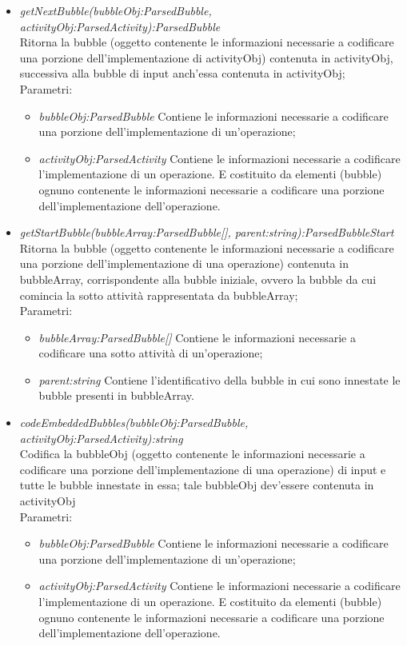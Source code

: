 \documentclass[../DefinizioneDiProdotto.tex]{subfiles}
\begin{document}
\begin{itemize}
\begin{itemize}
					\item \emph{getNextBubble(bubbleObj:ParsedBubble, activityObj:ParsedActivity):ParsedBubble} \\ 
					Ritorna la bubble (oggetto contenente le informazioni necessarie a codificare una porzione dell'implementazione di activityObj) contenuta in activityObj, successiva alla bubble di input anch'essa contenuta in activityObj; \\
					Parametri:
					\begin{itemize}
						\item \emph{bubbleObj:ParsedBubble} Contiene le informazioni necessarie a codificare una porzione dell'implementazione di un'operazione;
						\item \emph{activityObj:ParsedActivity} Contiene le informazioni necessarie a codificare l'implementazione di un operazione. E costituito da elementi (bubble) ognuno contenente le informazioni necessarie a codificare una porzione dell'implementazione dell'operazione.
					\end{itemize}	
					
					\item \emph{getStartBubble(bubbleArray:ParsedBubble[], parent:string):ParsedBubbleStart} \\ 
					Ritorna la bubble (oggetto contenente le informazioni necessarie a codificare una porzione dell'implementazione di una operazione) contenuta in bubbleArray, corrispondente alla bubble iniziale, ovvero la bubble da cui comincia la sotto attività rappresentata da bubbleArray; \\
					Parametri:
					\begin{itemize}
						\item \emph{bubbleArray:ParsedBubble[]} Contiene le informazioni necessarie a codificare una sotto attività di un'operazione;
						\item \emph{parent:string} Contiene l'identificativo della bubble in cui sono innestate le bubble presenti in bubbleArray.	
					\end{itemize}		
					
					\item \emph{codeEmbeddedBubbles(bubbleObj:ParsedBubble, activityObj:ParsedActivity):string} \\ 
					Codifica la bubbleObj (oggetto contenente le informazioni necessarie a codificare una porzione dell'implementazione di una operazione) di input e tutte le bubble innestate in essa; tale bubbleObj dev'essere contenuta in activityObj \\
					Parametri:
					\begin{itemize}
						\item \emph{bubbleObj:ParsedBubble} Contiene le informazioni necessarie a codificare una porzione dell'implementazione di un'operazione;
						\item \emph{activityObj:ParsedActivity} Contiene le informazioni necessarie a codificare l'implementazione di un operazione. E costituito da elementi (bubble) ognuno contenente le informazioni necessarie a codificare una porzione dell'implementazione dell'operazione.
					\end{itemize}
					

\end{itemize}
\end{itemize}
\end{document}
